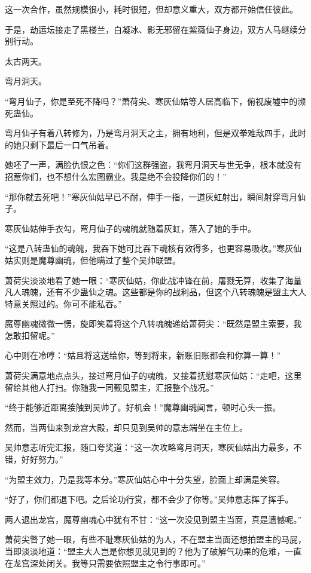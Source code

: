 \begin{this_body}
这一次合作，虽然规模很小，耗时很短，但却意义重大，双方都开始信任彼此。

于是，劫运坛接走了黑楼兰，白凝冰、影无邪留在紫薇仙子身边，双方人马继续分别行动。

太古两天。

弯月洞天。

“弯月仙子，你是至死不降吗？”萧荷尖、寒灰仙姑等人居高临下，俯视废墟中的濒死蛊仙。

弯月仙子有着八转修为，乃是弯月洞天之主，拥有地利，但是双拳难敌四手，此时的她只剩下最后一口气吊着。

她呸了一声，满脸仇恨之色：“你们这群强盗，我弯月洞天与世无争，根本就没有招惹你们，也不想什么宏图霸业。我是绝不会投降你们的！”

“那你就去死吧！”寒灰仙姑早已不耐，伸手一指，一道灰虹射出，瞬间射穿弯月仙子。

寒灰仙姑伸手衣勾，弯月仙子的魂魄就随着灰虹，落入了她的手中。

“这是八转蛊仙的魂魄，我吞下她可比吞下魂核有效得多，也更容易吸收。”寒灰仙姑实则是魔尊幽魂，但他瞒过了整个吴帅联盟。

萧荷尖淡淡地看了她一眼：“寒灰仙姑，你此战冲锋在前，屠戮无算，收集了海量凡人魂魄，还有不少蛊仙之魂。这些都是你的战利品，但这个八转魂魄是盟主大人特意关照过的。你可不能私吞。”

魔尊幽魂微微一愣，旋即笑着将这个八转魂魄递给萧荷尖：“既然是盟主索要，我怎敢扣留呢。”

心中则在冷哼：“姑且将这送给你，等到将来，新账旧账都会和你算一算！”

萧荷尖满意地点点头，接过弯月仙子的魂魄，又接着抚慰寒灰仙姑：“走吧，这里留给其他人打扫。你随我一同觐见盟主，汇报整个战况。”

“终于能够近距离接触到吴帅了。好机会！”魔尊幽魂闻言，顿时心头一振。

然而，当两仙来到龙宫大殿，却只见到吴帅的意志端坐在主位上。

吴帅意志听完汇报，随口夸奖道：“这一次攻略弯月洞天，寒灰仙姑出力最多，不错，好好努力。”

“为盟主效力，乃是我等本分。”寒灰仙姑心中十分失望，脸面上却满是笑容。

“好了，你们都退下吧。之后论功行赏，都不会少了你等。”吴帅意志挥了挥手。

两人退出龙宫，魔尊幽魂心中犹有不甘：“这一次没见到盟主当面，真是遗憾呢。”

萧荷尖瞥了她一眼，有些不耻寒灰仙姑的为人，不在盟主当面还想拍盟主的马屁，当即淡淡地道：“盟主大人岂是你想见就见到的？他为了破解气功果的危难，一直在龙宫深处闭关。我等只需要依照盟主之令行事即可。”


\end{this_body}
